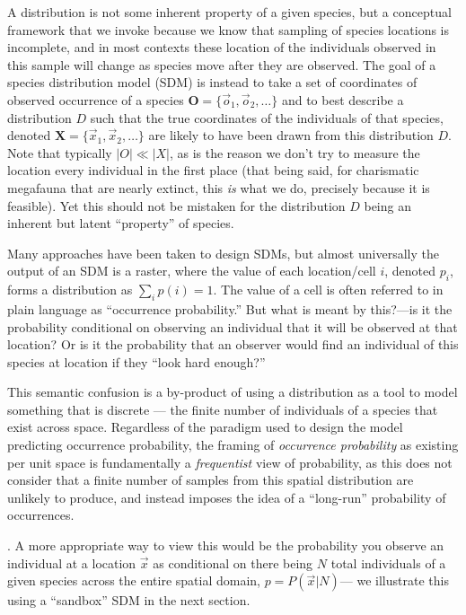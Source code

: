 \documentclass[10pt,oneside]{article}
\begin{document}
A distribution is not some inherent property of a given species, but a
conceptual framework that we invoke because we know that sampling of
species locations is incomplete, and in most contexts these location of
the individuals observed in this sample will change as species move
after they are observed. The goal of a species distribution model (SDM)
is instead to take a set of coordinates of observed occurrence of a
species \(\mathbf{O} = \{\vec{o}_1, \vec{o}_2, \dots\}\) and to best
describe a distribution \(D\) such that the true coordinates of the
individuals of that species, denoted
\(\mathbf{X} = \{\vec{x}_1, \vec{x}_2, \dots\}\) are likely to have been
drawn from this distribution \(D\). Note that typically \(|O| \ll |X|\),
as is the reason we don't try to measure the location every individual
in the first place (that being said, for charismatic megafauna that are
nearly extinct, this \emph{is} what we do, precisely because it is
feasible). Yet this should not be mistaken for the distribution \(D\)
being an inherent but latent ``property'' of species.

Many approaches have been taken to design SDMs, but almost universally
the output of an SDM is a raster, where the value of each location/cell
\(i\), denoted \(p_i\), forms a distribution as \(\sum_{i} p(i) = 1\).
The value of a cell is often referred to in plain language as
``occurrence probability.'' But what is meant by this?---is it the
probability conditional on observing an individual that it will be
observed at that location? Or is it the probability that an observer
would find an individual of this species at location if they ``look hard
enough?''

This semantic confusion is a by-product of using a distribution as a
tool to model something that is discrete --- the finite number of
individuals of a species that exist across space. Regardless of the
paradigm used to design the model predicting occurrence probability, the
framing of \emph{occurrence probability} as existing per unit space is
fundamentally a \emph{frequentist} view of probability, as this does not
consider that a finite number of samples from this spatial distribution
are unlikely to produce, and instead imposes the idea of a ``long-run''
probability of occurrences.

. A more appropriate way to view this would be the probability you
observe an individual at a location \(\vec{x}\) as conditional on there
being \(N\) total individuals of a given species across the entire
spatial domain, \(p = P(\vec{x} | N)\)--- we illustrate this using a
``sandbox'' SDM in the next section.
\end{document}
